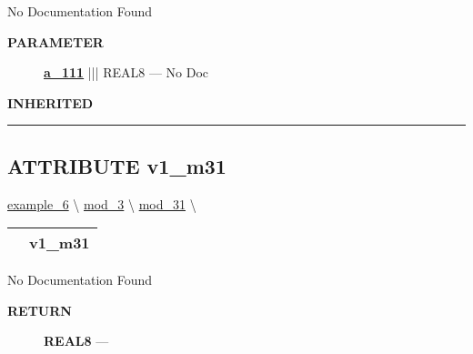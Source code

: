 No Documentation Found






\par
\begin{description}
\item [\colorbox{tagtype}{\color{white} \textbf{\textsf{PARAMETER}}}] \textbf{\underline{a\_111}} ||| REAL8 --- No Doc
\end{description}








\par
\begin{description}
\item [\colorbox{tagtype}{\color{white} \textbf{\textsf{INHERITED}}}] 
\end{description}



\rule{\linewidth}{0.5pt}
\subsection*{\textsf{\colorbox{headtoc}{\color{white} ATTRIBUTE}
v1\_m31}}

\hypertarget{ecldoc:example_6.mod_3.mod_31.v1_m31}{}
\hspace{0pt} \hyperlink{ecldoc:example_6}{example_6} \textbackslash 
\hspace{0pt} \hyperlink{ecldoc:example_6.mod_3}{mod_3} \textbackslash 
\hspace{0pt} \hyperlink{ecldoc:example_6.mod_3.mod_31}{mod_31} \textbackslash 

{\renewcommand{\arraystretch}{1.5}
\begin{tabularx}{\textwidth}{|>{\raggedright\arraybackslash}l|X|}
\hline
\hspace{0pt}\mytexttt{\color{red} } & \textbf{v1\_m31} \\
\hline
\end{tabularx}
}

\par





No Documentation Found








\par
\begin{description}
\item [\colorbox{tagtype}{\color{white} \textbf{\textsf{RETURN}}}] \textbf{REAL8} --- 
\end{description}




